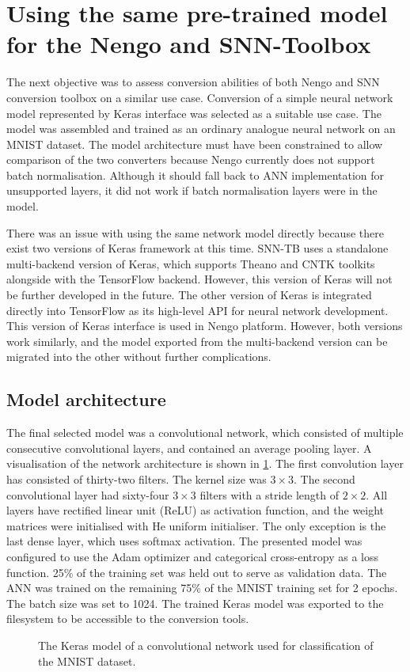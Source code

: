 \section{Using the same pre-trained model for the Nengo and SNN-Toolbox}
The next objective was to assess conversion abilities of both Nengo and SNN conversion toolbox on a similar use case. Conversion of a simple neural network model represented by Keras interface was selected as a suitable use case. The model was assembled and trained as an ordinary analogue neural network on an MNIST dataset. The model architecture must have been constrained to allow comparison of the two converters because Nengo currently does not support batch normalisation. Although it should fall back to ANN implementation for unsupported layers, it did not work if batch normalisation layers were in the model.\par
There was an issue with using the same network model directly because there exist two versions of Keras framework at this time. SNN-TB uses a standalone multi-backend version of Keras, which supports Theano and CNTK toolkits alongside with the TensorFlow backend. However, this version of Keras will not be further developed in the future. The other version of Keras is integrated directly into TensorFlow as its high-level API for neural network development. This version of Keras interface is used in Nengo platform. However, both versions work similarly, and the model exported from the multi-backend version can be migrated into the other without further complications.

\subsection{Model architecture}
The final selected model was a convolutional network, which consisted of multiple consecutive convolutional layers, and contained an average pooling layer. A visualisation of the network architecture is shown in \cref{fig:keras_model}. The first convolution layer has consisted of thirty-two filters. The kernel size was $3 \times 3$. The second convolutional layer had sixty-four $3 \times 3$ filters with a stride length of $2 \times 2$. All layers have rectified linear unit (ReLU) as activation function, and the weight matrices were initialised with He uniform initialiser. The only exception is the last dense layer, which uses softmax activation. The presented model was configured to use the Adam \cite{kingmaAdamMethod17} optimizer and categorical cross-entropy as a loss function. 25\% of the training set was held out to serve as validation data. The ANN was trained on the remaining 75\% of the MNIST training set for 2 epochs. The batch size was set to 1024. The trained Keras model was exported to the filesystem to be accessible to the conversion tools. \par
\begin{figure}[htbp]
    \centering
    
    \caption{The Keras model of a convolutional network used for classification of the MNIST dataset.}
    \label{fig:keras_model}
\end{figure}

